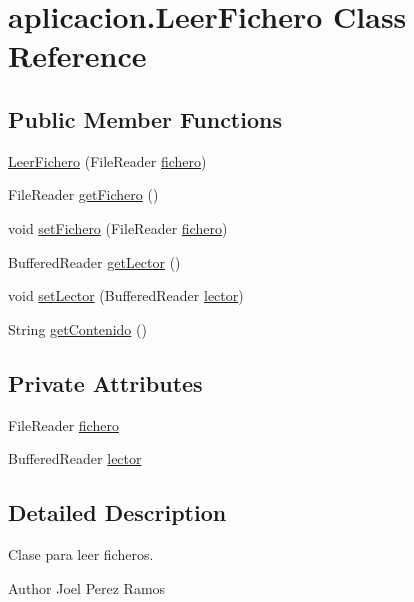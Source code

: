\hypertarget{classaplicacion_1_1_leer_fichero}{}\section{aplicacion.\+Leer\+Fichero Class Reference}
\label{classaplicacion_1_1_leer_fichero}
\subsection*{Public Member Functions}
\begin{DoxyCompactItemize}
\item 
\hyperlink{classaplicacion_1_1_leer_fichero_a6ecbade55a18cd4e748dfd664d7ede6b}{Leer\+Fichero} (File\+Reader \hyperlink{classaplicacion_1_1_leer_fichero_a9f9faaf160d4f3fdb36dfaf1c929fb13}{fichero})
\item 
File\+Reader \hyperlink{classaplicacion_1_1_leer_fichero_ac85026646b27dee1b9dd2d28eaa4ae59}{get\+Fichero} ()
\item 
void \hyperlink{classaplicacion_1_1_leer_fichero_a8472b4b43bd6e2d3bc65a45e1f935b18}{set\+Fichero} (File\+Reader \hyperlink{classaplicacion_1_1_leer_fichero_a9f9faaf160d4f3fdb36dfaf1c929fb13}{fichero})
\item 
Buffered\+Reader \hyperlink{classaplicacion_1_1_leer_fichero_ae9b6c34feb9e518c222eb23937a81716}{get\+Lector} ()
\item 
void \hyperlink{classaplicacion_1_1_leer_fichero_aa4bde84f5a2616e197367dcb1d14bc77}{set\+Lector} (Buffered\+Reader \hyperlink{classaplicacion_1_1_leer_fichero_ad2530808a0febf01b96fdddf04eea34a}{lector})
\item 
String \hyperlink{classaplicacion_1_1_leer_fichero_a1bbd72cd2d98a81cc7ebabae57465e7f}{get\+Contenido} ()
\end{DoxyCompactItemize}
\subsection*{Private Attributes}
\begin{DoxyCompactItemize}
\item 
File\+Reader \hyperlink{classaplicacion_1_1_leer_fichero_a9f9faaf160d4f3fdb36dfaf1c929fb13}{fichero}
\item 
Buffered\+Reader \hyperlink{classaplicacion_1_1_leer_fichero_ad2530808a0febf01b96fdddf04eea34a}{lector}
\end{DoxyCompactItemize}


\subsection{Detailed Description}
Clase para leer ficheros. \begin{DoxyAuthor}{Author}
Joel Perez Ramos 
\end{DoxyAuthor}


